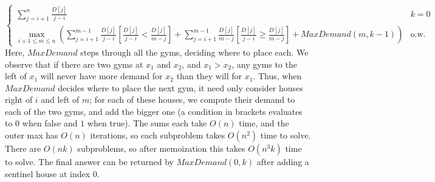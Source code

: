 \documentclass[fleqn]{article}
\begin{document}
\begin{enumerate}
\begin{answer}
\[\begin{cases}
                \sum_{j=i+1}^{n}\frac{D[j]}{j-i} & k = 0 \\
                \max_{i + 1 \leq m \leq n} \left(\sum_{j=i+1}^{m-1} \frac{D[j]}{j-i}\left[\frac{D[j]}{j-i} < \frac{D[j]}{m-j}\right] + \sum_{j=i+1}^{m-1} \frac{D[j]}{m-j}\left[\frac{D[j]}{j-i} \geq \frac{D[j]}{m-j}\right] + MaxDemand(m,k-1)\right) & \text{o.w.}
            \end{cases}
        \]
        Here, $MaxDemand$ steps through all the gyms, deciding where to place each. We observe that if there are two gyms at $x_1$ and $x_2$, and $x_1 > x_2$, any gyms to the left of $x_1$ will never have more demand for $x_2$ than they will for $x_1$. Thus, when $MaxDemand$ decides where to place the next gym, it need only consider houses right of $i$ and left of $m$; for each of these houses, we compute their demand to each of the two gyms, and add the bigger one (a condition in brackets evaluates to $0$ when false and $1$ when true). The sums each take $O(n)$ time, and the outer max has $O(n)$ iterations, so each subproblem takes $O(n^2)$ time to solve. There are $O(nk)$ subproblems, so after memoization this takes $O(n^3 k)$ time to solve. The final answer can be returned by $MaxDemand(0,k)$ after adding a sentinel house at index $0$.
    \end{answer}
\end{enumerate}
\end{document}

